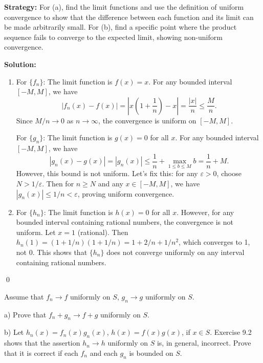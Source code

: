 \noindent\textbf{Strategy:} For (a), find the limit functions and use the definition of uniform convergence to show that the difference between each function and its limit can be made arbitrarily small. For (b), find a specific point where the product sequence fails to converge to the expected limit, showing non-uniform convergence.

\bigskip\noindent\textbf{Solution:} 
\begin{enumerate}[label=(\alph*)]
\item For \(\{f_n\}\): The limit function is \( f(x) = x \). For any bounded interval \([-M, M]\), we have
\[|f_n(x) - f(x)| = \left|x \left(1 + \frac{1}{n}\right) - x\right| = \frac{|x|}{n} \leq \frac{M}{n}.\]
Since \( M/n \to 0 \) as \( n \to \infty \), the convergence is uniform on \([-M, M]\).

For \(\{g_n\}\): The limit function is \( g(x) = 0 \) for all \( x \). For any bounded interval \([-M, M]\), we have
\[|g_n(x) - g(x)| = |g_n(x)| \leq \frac{1}{n} + \max_{1 \leq b \leq M} b = \frac{1}{n} + M.\]
However, this bound is not uniform. Let's fix this: for any \( \varepsilon > 0 \), choose \( N > 1/\varepsilon \). Then for \( n \geq N \) and any \( x \in [-M, M] \), we have \( |g_n(x)| \leq 1/n < \varepsilon \), proving uniform convergence.

\item For \(\{h_n\}\): The limit function is \( h(x) = 0 \) for all \( x \). However, for any bounded interval containing rational numbers, the convergence is not uniform. Let \( x = 1 \) (rational). Then \( h_n(1) = (1 + 1/n)(1 + 1/n) = 1 + 2/n + 1/n^2 \), which converges to 1, not 0. This shows that \(\{h_n\}\) does not converge uniformly on any interval containing rational numbers.
\end{enumerate}\qed


\begin{problembox}
Assume that \( f_n \to f \) uniformly on \( S \), \( g_n \to g \) uniformly on \( S \).

a) Prove that \( f_n + g_n \to f + g \) uniformly on \( S \).

b) Let \( h_n(x) = f_n(x) g_n(x) \), \( h(x) = f(x) g(x) \), if \( x \in S \). Exercise 9.2 shows that the assertion \( h_n \to h \) uniformly on \( S \) is, in general, incorrect. Prove that it is correct if each \( f_n \) and each \( g_n \) is bounded on \( S \).
\end{problembox}

